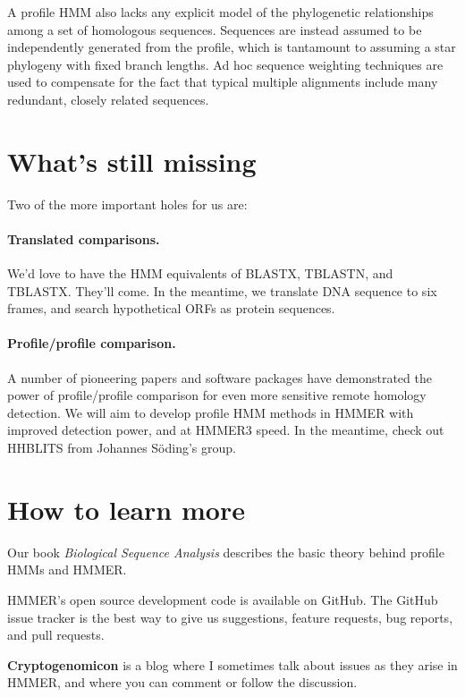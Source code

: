 A profile HMM also lacks any explicit model of the phylogenetic
relationships among a set of homologous sequences. Sequences are
instead assumed to be independently generated from the profile, which
is tantamount to assuming a star phylogeny with fixed branch
lengths. Ad hoc sequence weighting techniques are used to compensate
for the fact that typical multiple alignments include many redundant,
closely related sequences.


\section{What's still missing}

Two of the more important holes for us are:

\paragraph{Translated comparisons.} We'd love to have the HMM
equivalents of BLASTX, TBLASTN, and TBLASTX. They'll come. In the
meantime, we translate DNA sequence to six frames, and search
hypothetical ORFs as protein sequences.

\paragraph{Profile/profile comparison.} A number of pioneering papers and
software packages have demonstrated the power of profile/profile
comparison for even more sensitive remote homology detection. We will
aim to develop profile HMM methods in HMMER with improved detection
power, and at HMMER3 speed. In the meantime, check out
HHBLITS from Johannes S\"oding's
group.


\section{How to learn more}

Our book \emph{Biological Sequence Analysis}\cite{Durbin98} describes the basic
theory behind profile HMMs and HMMER.

HMMER's open source development code is available on
GitHub.
The GitHub issue tracker is the best way to give us suggestions,
feature requests, bug reports, and pull requests.

\textbf{Cryptogenomicon}
  is a blog where I sometimes talk about issues as they arise in HMMER, and
where you can comment or follow the discussion.


